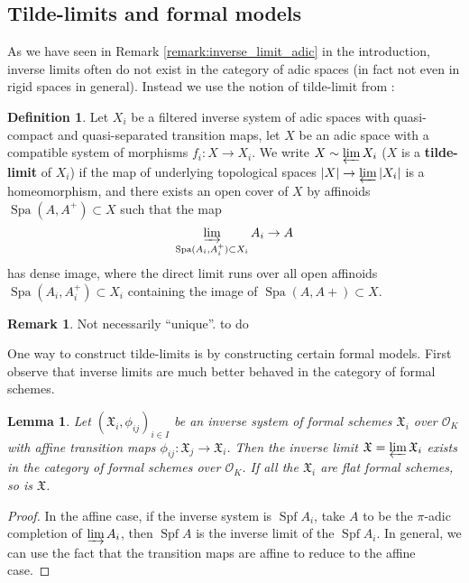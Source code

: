 \documentclass[10pt,oneside]{amsart}
\newtheorem{lemma}[theorem]{Lemma}
\theoremstyle{definition}
\newtheorem{definition}[theorem]{Definition}
\newtheorem{remark}[theorem]{Remark}
\begin{document}
	

		\subsection{Tilde-limits and formal models} 
		
	As we have seen in Remark \ref{remark:inverse_limit_adic} in the introduction, inverse limits often do not exist in the category of adic spaces (in fact not even in rigid spaces in general). Instead we use the notion of tilde-limit from \cite{SW}:
	
	\begin{definition} 
Let $X_i$ be a filtered inverse system of adic spaces with quasi-compact and quasi-separated transition maps, let $X$ be an adic space with a compatible system of morphisms $f_i: X \rightarrow X_i$. We write $X \sim \varprojlim X_i$ ($X$ is a \textbf{tilde-limit} of $X_i$) if the map of underlying topological spaces $|X| \rightarrow \varprojlim |X_i|$ is a homeomorphism, and there exists an open cover of $X$ by affinoids $\operatorname{Spa} (A, A^+) \subset X$ such that the map 
$$ \varinjlim_{\operatorname{Spa}(A_i, A_i^+) \subset X_i} A_i \rightarrow A$$
has dense image, where the direct limit runs over all open affinoids $\operatorname{Spa}(A_i, A_i^+) \subset X_i$ containing the image of $\operatorname{Spa}(A, A+) \subset X$.
	\end{definition}
	
	\begin{remark}
	Not necessarily ``unique''. {\color{red} to do}
	\end{remark}
	
One way to construct tilde-limits is by constructing certain formal models. First observe that inverse limits are much better behaved in the category of formal schemes. 

	\begin{lemma} \label{lemma:inverse_limit_formal}
		Let $(\mathfrak X_i,\phi_{ij})_{i\in I}$ be an inverse system of formal schemes $\mathfrak X_i$ over $\mathcal O_K$ with affine transition maps $\phi_{ij}:\mathfrak X_j\rightarrow \mathfrak X_i$. Then the inverse limit $\mathfrak X=\varprojlim \mathfrak X_i$ exists in the category of formal schemes over $\mathcal O_K$. If all the $\mathfrak X_i$ are flat formal schemes, so is $\mathfrak X$.
	\end{lemma}
	\begin{proof}
	In the affine case, if the inverse system is $\operatorname{Spf} A_i$, take $A$ to be the $\pi$-adic completion of $\varinjlim A_i$, then  $\operatorname{Spf} A$ is the inverse limit of the $\operatorname{Spf}A_i$. In general, we can use the fact that the transition maps are affine to reduce to the affine case. 
	\end{proof}
	
\end{document}

